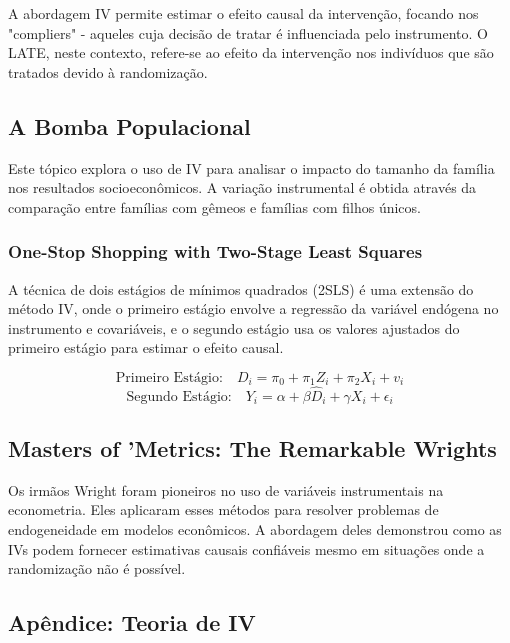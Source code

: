\documentclass[a4paper,12pt]{article}[abntex2]
\begin{document}
A abordagem IV permite estimar o efeito causal da intervenção, focando nos "compliers" - aqueles cuja decisão de tratar é influenciada pelo instrumento. O LATE, neste contexto, refere-se ao efeito da intervenção nos indivíduos que são tratados devido à randomização.

\subsection{A Bomba Populacional}

Este tópico explora o uso de IV para analisar o impacto do tamanho da família nos resultados socioeconômicos. A variação instrumental é obtida através da comparação entre famílias com gêmeos e famílias com filhos únicos.

\subsubsection*{One-Stop Shopping with Two-Stage Least Squares}

A técnica de dois estágios de mínimos quadrados (2SLS) é uma extensão do método IV, onde o primeiro estágio envolve a regressão da variável endógena no instrumento e covariáveis, e o segundo estágio usa os valores ajustados do primeiro estágio para estimar o efeito causal.

\begin{equation}
    \text{Primeiro Estágio:} \quad D_i = \pi_0 + \pi_1 Z_i + \pi_2 X_i + v_i
\end{equation}
\begin{equation}
    \text{Segundo Estágio:} \quad Y_i = \alpha + \beta \hat{D}_i + \gamma X_i + \epsilon_i
\end{equation}

\subsection*{Masters of 'Metrics: The Remarkable Wrights}

Os irmãos Wright foram pioneiros no uso de variáveis instrumentais na econometria. Eles aplicaram esses métodos para resolver problemas de endogeneidade em modelos econômicos. A abordagem deles demonstrou como as IVs podem fornecer estimativas causais confiáveis mesmo em situações onde a randomização não é possível.

\subsection*{Apêndice: Teoria de IV}
\end{document}
